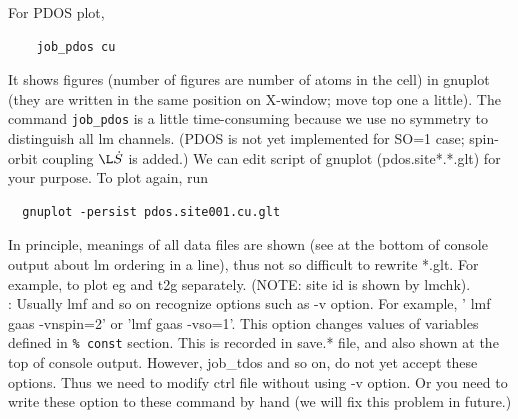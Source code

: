 \documentclass[a4paper,10pt,epsf,fleqn]{article}
\begin{document}
For PDOS plot,
\begin{verbatim}
    job_pdos cu
\end{verbatim}
It shows figures (number of figures are number of atoms in the cell) in
gnuplot (they are written in the same position on X-window;
move top one a little). The command \verb+job_pdos+ is a little 
time-consuming because we use no symmetry to distinguish all lm channels.
(PDOS is not yet implemented for SO=1 case; spin-orbit coupling $\L\dot S$ is added.)
We can edit script of gnuplot (pdos.site*.*.glt) for your purpose.
To plot again, run
\begin{verbatim}
  gnuplot -persist pdos.site001.cu.glt
\end{verbatim}
In principle, meanings of all data files are shown (see at the bottom
of console output about lm ordering in a line), thus not so difficult to
rewrite *.glt. For example, to plot eg and t2g separately. 
(NOTE: site id is shown by lmchk).\\

: 
Usually lmf and so on recognize options such as -v option. For example,
' lmf gaas -vnspin=2' or 'lmf gaas -vso=1'. 
This option changes values of variables defined in \verb+% const+ section.
This is recorded in save.* file, and also shown at the top of console output. 
However, job\_tdos and so on, do not yet accept these options.
Thus we need to modify ctrl file without using -v option.
Or you need to write these option to these command by hand
(we will fix this problem in future.)

\end{document}
